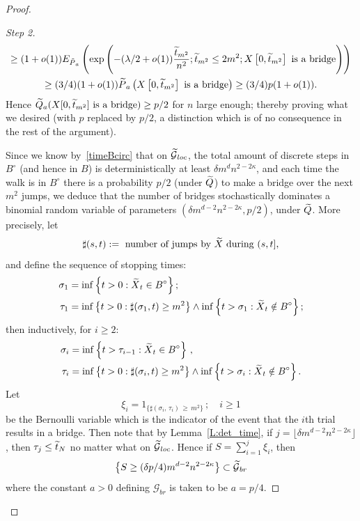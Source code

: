 \documentclass[10pt]{amsart}
\theoremstyle{definition}\newtheorem{defi}[theo]{Definition}\newtheorem{rema}[theo]{Remark}\newtheorem{exam}[theo]{Example}\newtheorem{exem}[theo]{Example}\newtheorem{nota}[theo]{Notation}
\newenvironment{step}[1]{\begin{proof}[#1]}{\let\qed\relax\end{proof}}
\newcommand{\Pmh}{P}
\newcommand*\E {{E}}
\newcommand{\cG}{\mathcal{G}}
\newcommand*\Q{{Q}}
\let\oldtilde\tilde
\renewcommand*{\tilde}[1]{\mathchoice{\widetilde{#1}}{\widetilde{#1}}{\oldtilde{#1}}{\oldtilde{#1}}}\let\oldhat\hat
\renewcommand*{\hat}[1]{\mathchoice{\widehat{#1}}{\widehat{#1}}{\oldhat{#1}}{\oldhat{#1}}}\let\oldexists\exists
\renewcommand*{\exists}{\mathrel{\oldexists}}
\begin{document}
\begin{proof}
\begin{step}{Step 2}
\begin{multline*}
\ge (1+ o(1))\E_{\tilde \Pmh_a} \left(\exp\left(- (\lambda/2 + o(1)) \frac{\tilde t_{m^2}}{n^2}; \tilde t_{m^2} \le 2m^2 ; X\left[0, \tilde t_{m^2}\right] \text{ is a bridge}\right)\right)\\
\ge (3/4) (1+ o(1)) \tilde \Pmh_a\left(X\left[0, \tilde t_{m^2}\right] \text{ is a bridge}\right) \ge (3/4) p (1+ o(1)).
\end{multline*}
Hence $\tilde \Q_a(X[0, \tilde t_{m^2}]\text{ is a bridge}) \ge p/2$ for $n$ large enough; thereby proving what we desired (with $p$ replaced by $p/2$, a distinction which is of no consequence in the rest of the argument).



Since we know by~\eqref{timeBcirc} that on $ \tilde \cG_{loc}$, the total amount of discrete steps in $B^\circ$ (and hence in $B$) is deterministically at least $\delta m^d n^{2- 2\kappa}$, and each time the walk is in $B^\circ$ there is a probability $p/2$ (under $\tilde \Q$) to make a bridge over the next $m^2$ jumps, we deduce that the number of bridges stochastically dominates a binomial random variable of parameters $(\delta m^{d-2} n^{2-2\kappa}, p/2)$, under $\tilde \Q$. More precisely, let
\[
\sharp (s,t): = \text{ number of jumps by $\tilde X $ during } (s, t],
\]
and define the sequence of stopping times:
\begin{align*}
\sigma_1 &= \inf \left\{ t>0 : \tilde X_t \in B^\circ\right\}; \\
\tau_1 &= \inf \left\{t>0: \sharp (\sigma_1, t) \ge m^2\right\} \wedge \inf \left\{ t > \sigma_1: \tilde X_t \notin B^\circ\right\};
\end{align*}
then inductively, for $i \ge 2$:
\begin{align*}
\sigma_i &= \inf \left\{ t > \tau_{i-1} : \tilde X_t \in B^\circ\right\}\,,\\
\tau_i &= \inf \left\{ t>0 : \sharp (\sigma_i, t) \ge m^2\right\} \wedge \inf \left\{ t> \sigma_i: \tilde X_t \notin B^\circ\right\}.
\end{align*}
Let
\[
\xi_i = 1_{\{\sharp(\sigma_i,\,\tau_i)\,\ge\, m^2\}}\,; \quad i \ge 1
\]
be the Bernoulli variable which is the indicator of the event that the $i$th trial results in a bridge. Then note that by Lemma~\ref{L:det_time}, if $j = \lfloor \delta m^{d-2} n^{2- 2\kappa}\rfloor $, then $\tau_j \le \tilde t_N$ no matter what on $\tilde \cG_{loc}$. Hence if $S = \sum_{i=1}^j \xi_i$, then
\[
\left\{S \ge (\delta p /4) m^{d-2} n^{2- 2\kappa}\right\} \subset \tilde \cG_{br}
\]
where the constant $a>0$ defining $\cG_{br}$ is taken to be $a = p /4$.


\end{step}
\end{proof}
\end{document}
